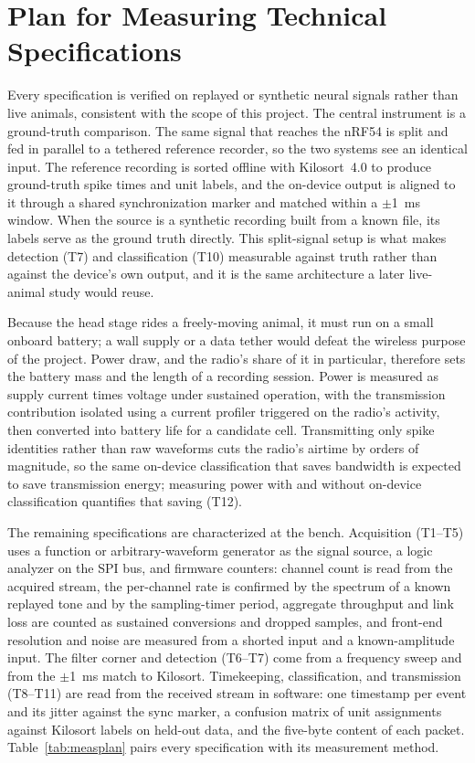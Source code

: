 \documentclass[11pt]{article}
\begin{document}
\section{Plan for Measuring Technical Specifications}

Every specification is verified on replayed or synthetic neural signals rather than live
animals, consistent with the scope of this project. The central instrument is a ground-truth
comparison. The same signal that reaches the nRF54 is split and fed in parallel to a tethered
reference recorder, so the two systems see an identical input. The reference recording is
sorted offline with Kilosort~4.0 to produce ground-truth spike times and unit labels, and the
on-device output is aligned to it through a shared synchronization marker and matched within a
$\pm$1~ms window. When the source is a synthetic recording built from a known file, its labels
serve as the ground truth directly. This split-signal setup is what makes detection (T7) and
classification (T10) measurable against truth rather than against the device's own output, and
it is the same architecture a later live-animal study would reuse.

Because the head stage rides a freely-moving animal, it must run on a small onboard battery; a
wall supply or a data tether would defeat the wireless purpose of the project. Power draw, and
the radio's share of it in particular, therefore sets the battery mass and the length of a
recording session. Power is measured as supply current times voltage under sustained
operation, with the transmission contribution isolated using a current profiler triggered on
the radio's activity, then converted into battery life for a candidate cell. Transmitting only
spike identities rather than raw waveforms cuts the radio's airtime by orders of magnitude, so
the same on-device classification that saves bandwidth is expected to save transmission energy;
measuring power with and without on-device classification quantifies that saving (T12).

The remaining specifications are characterized at the bench. Acquisition (T1--T5) uses a
function or arbitrary-waveform generator as the signal source, a logic analyzer on the SPI
bus, and firmware counters: channel count is read from the acquired stream, the per-channel
rate is confirmed by the spectrum of a known replayed tone and by the sampling-timer period,
aggregate throughput and link loss are counted as sustained conversions and dropped samples,
and front-end resolution and noise are measured from a shorted input and a known-amplitude
input. The filter corner and detection (T6--T7) come from a frequency sweep and from the
$\pm$1~ms match to Kilosort. Timekeeping, classification, and transmission (T8--T11) are read
from the received stream in software: one timestamp per event and its jitter against the sync
marker, a confusion matrix of unit assignments against Kilosort labels on held-out data, and
the five-byte content of each packet. Table~\ref{tab:measplan} pairs every specification with
its measurement method.
\end{document}
